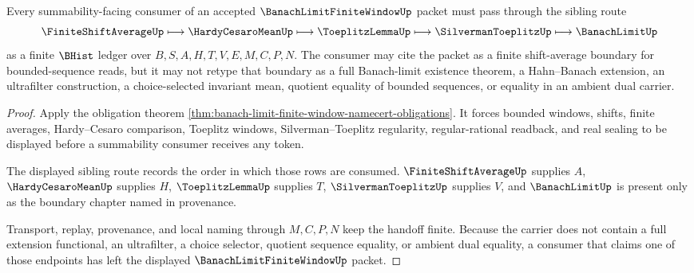 \begin{theorem}
\label{thm:banach-limit-finite-window-summability-boundary}
Every summability-facing consumer of an accepted $\BanachLimitFiniteWindowUp$ packet must pass through the sibling route
$$
\FiniteShiftAverageUp \longmapsto \HardyCesaroMeanUp \longmapsto \ToeplitzLemmaUp \longmapsto \SilvermanToeplitzUp \longmapsto \BanachLimitUp
$$
as a finite $\BHist$ ledger over $B,S,A,H,T,V,E,M,C,P,N$. The consumer may cite the packet as a finite shift-average boundary for bounded-sequence reads, but it may not retype that boundary as a full Banach-limit existence theorem, a Hahn--Banach extension, an ultrafilter construction, a choice-selected invariant mean, quotient equality of bounded sequences, or equality in an ambient dual carrier.
\end{theorem}
\begin{proof}
Apply the obligation theorem \autoref{thm:banach-limit-finite-window-namecert-obligations}. It forces bounded windows, shifts, finite averages, Hardy--Cesaro comparison, Toeplitz windows, Silverman--Toeplitz regularity, regular-rational readback, and real sealing to be displayed before a summability consumer receives any token.

The displayed sibling route records the order in which those rows are consumed. $\FiniteShiftAverageUp$ supplies $A$, $\HardyCesaroMeanUp$ supplies $H$, $\ToeplitzLemmaUp$ supplies $T$, $\SilvermanToeplitzUp$ supplies $V$, and $\BanachLimitUp$ is present only as the boundary chapter named in provenance.

Transport, replay, provenance, and local naming through $M,C,P,N$ keep the handoff finite. Because the carrier does not contain a full extension functional, an ultrafilter, a choice selector, quotient sequence equality, or ambient dual equality, a consumer that claims one of those endpoints has left the displayed $\BanachLimitFiniteWindowUp$ packet.
\end{proof}



